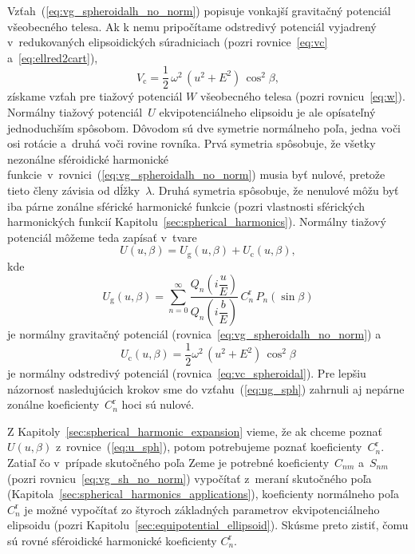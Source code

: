 \documentclass[a4paper,12pt]{book}
\newcommand{\gidx}{\mathrm g}
\newcommand{\cidx}{\mathrm c}
\begin{document}
Vzťah~(\ref{eq:vg_spheroidalh_no_norm}) popisuje vonkajší gravitačný potenciál 
všeobecného telesa.  Ak k nemu pripočítame odstredivý potenciál vyjadrený 
v~redukovaných elipsoidických súradniciach (pozri rovnice~\ref{eq:vc} 
a~\ref{eq:ellred2cart}),
%
\begin{equation}
\label{eq:vc_spheroidal}
V_\cidx = \frac{1}{2} \, \omega^2 \, (u^2 + E^2) \, \cos^2\beta{,}
\end{equation}
%
získame vzťah pre tiažový potenciál $W$ všeobecného telesa (pozri 
rovnicu~\ref{eq:w}).  Normálny tiažový potenciál~$U$ ekvipotenciálneho 
elipsoidu je ale opísateľný jednoduchším spôsobom.  Dôvodom sú dve symetrie 
normálneho poľa, jedna voči osi rotácie a~druhá voči rovine rovníka.  Prvá 
symetria spôsobuje, že všetky nezonálne sféroidické harmonické 
funkcie~v~rovnici~(\ref{eq:vg_spheroidalh_no_norm}) musia byť nulové, pretože 
tieto členy závisia od dĺžky~$\lambda$.  Druhá symetria spôsobuje, že nenulové 
môžu byť iba párne zonálne sférické harmonické funkcie (pozri vlastnosti 
sférických harmonických funkcií Kapitolu~\ref{sec:spherical_harmonics}).  
Normálny tiažový potenciál môžeme teda zapísať v~tvare
%
\begin{equation}
\label{eq:u_sph}
U(u, \beta) = U_\gidx(u, \beta) + U_\cidx(u, \beta){,}
\end{equation}
%
kde
%
\begin{equation}
\label{eq:ug_sph}
U_\gidx(u, \beta) = \sum_{n = 0}^\infty \frac{Q_n\left( i \dfrac{u}{E} 
\right)}{Q_n\left( i \dfrac{b}{E} \right)} \,  C^{\mathrm{r}}_n \, 
P_n(\sin\beta)
\end{equation}
%
je normálny gravitačný potenciál (rovnica~\ref{eq:vg_spheroidalh_no_norm}) 
a
%
\begin{equation}
\label{eq:uc_sph}
U_\cidx(u, \beta) = \frac{1}{2} \omega^2 \, (u^2 + E^2) \, \cos^2\beta
\end{equation}
%
je normálny odstredivý potenciál (rovnica~\ref{eq:vc_spheroidal}).  Pre lepšiu 
názornosť nasledujúcich krokov sme do vzťahu~(\ref{eq:ug_sph}) zahrnuli aj 
nepárne zonálne koeficienty~$C^{\mathrm{r}}_n$ hoci sú nulové.

Z Kapitoly~\ref{sec:spherical_harmonic_expansion} vieme, že ak chceme poznať 
$U(u,\beta)$ z~rovnice~(\ref{eq:u_sph}), potom potrebujeme poznať 
koeficienty~$C_n^\mathrm{r}$.  Zatiaľ čo v~prípade skutočného poľa Zeme je 
potrebné koeficienty~$C_{nm}$ a~$S_{nm}$ (pozri rovnicu~\ref{eq:vg_sh_no_norm}) 
vypočítať z~meraní skutočného poľa 
(Kapitola~\ref{sec:spherical_harmonics_applications}), koeficienty normálneho 
poľa $C_n^\mathrm{r}$ je možné vypočítať zo štyroch základných parametrov 
ekvipotenciálneho elipsoidu (pozri Kapitolu~\ref{sec:equipotential_ellipsoid}).  
Skúsme preto zistiť, čomu sú rovné sféroidické harmonické koeficienty 
$C_n^\mathrm{r}$.
\end{document}
